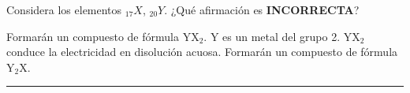 \documentclass[a4paper,addpoints,14pt]{exam}
\newcommand*\chem[1]{\ensuremath{\mathrm{#1}}}
\newcommand{\halmos}{\vspace*{-4mm}
	
					\begin{flushright}
						\rule{1mm}{2.5mm} 
					\end{flushright}\vspace*{-4mm}
						
					  }
\renewcommand{\qed}{\halmos}
\begin{document}
\begin{questions}
	
\begin{question}[1] Considera los elementos $_{17}X$, $_{20}Y$. ¿Qué afirmación es \textbf{\small{INCORRECTA}}?
		\begin{checkboxes} 
		\choice	Formarán un compuesto de fórmula \chem{YX_2}.
		\choice \chem{Y} es un metal del grupo 2.
		\choice \chem{YX_2} conduce la electricidad en disolución acuosa.
		\CorrectChoice Formarán un compuesto de fórmula \chem{Y_2X}.
		\end{checkboxes}
		\qed
		\end{question}
		
	
	
		
%
%	
%	


\end{questions}
\end{document}
